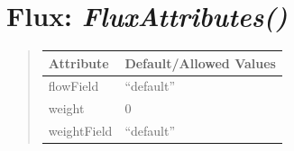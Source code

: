 \documentclass[letterpaper,10pt,english]{sphinxmanual}
\begin{document}
\begin{DUlineblock}{0em}
\item[] 
\end{DUlineblock}

\begin{DUlineblock}{0em}
\item[] 
\end{DUlineblock}


\section{\textbf{Flux}: \emph{FluxAttributes()}}
\label{attributes:flux-fluxattributes}
\begin{DUlineblock}{0em}
\item[] 
\end{DUlineblock}
\begin{quote}

\begin{tabulary}{\linewidth}{|L|L|}
\hline

\textbf{Attribute}
 & 
\textbf{Default/Allowed Values}
\\
\hline
flowField
 & 
``default''
\\
\hline
weight
 & 
0
\\
\hline
weightField
 & 
``default''
\\
\hline\end{tabulary}

\end{quote}

\begin{DUlineblock}{0em}
\item[] 
\end{DUlineblock}

\begin{DUlineblock}{0em}
\item[] 
\end{DUlineblock}
\end{document}

